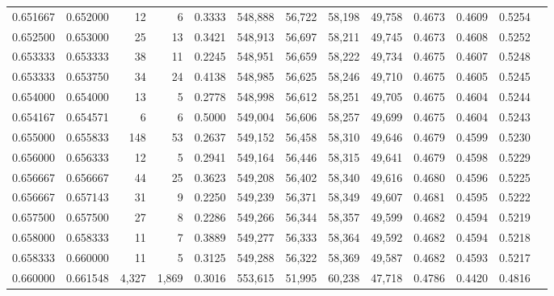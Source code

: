 \begin{tabular}{rrrrrrrrrrrrr}
0.651667 & 0.652000 &     12 &     6 &                                     0.3333 & 548,888 &  56,722 &  58,198 &  49,758 & 0.4673 & 0.4609 & 0.5254 \\
0.652500 & 0.653000 &     25 &    13 &                                     0.3421 & 548,913 &  56,697 &  58,211 &  49,745 & 0.4673 & 0.4608 & 0.5252 \\
0.653333 & 0.653333 &     38 &    11 &                                     0.2245 & 548,951 &  56,659 &  58,222 &  49,734 & 0.4675 & 0.4607 & 0.5248 \\
0.653333 & 0.653750 &     34 &    24 &                                     0.4138 & 548,985 &  56,625 &  58,246 &  49,710 & 0.4675 & 0.4605 & 0.5245 \\
0.654000 & 0.654000 &     13 &     5 &                                     0.2778 & 548,998 &  56,612 &  58,251 &  49,705 & 0.4675 & 0.4604 & 0.5244 \\
0.654167 & 0.654571 &      6 &     6 &                                     0.5000 & 549,004 &  56,606 &  58,257 &  49,699 & 0.4675 & 0.4604 & 0.5243 \\
0.655000 & 0.655833 &    148 &    53 &                                     0.2637 & 549,152 &  56,458 &  58,310 &  49,646 & 0.4679 & 0.4599 & 0.5230 \\
0.656000 & 0.656333 &     12 &     5 &                                     0.2941 & 549,164 &  56,446 &  58,315 &  49,641 & 0.4679 & 0.4598 & 0.5229 \\
0.656667 & 0.656667 &     44 &    25 &                                     0.3623 & 549,208 &  56,402 &  58,340 &  49,616 & 0.4680 & 0.4596 & 0.5225 \\
0.656667 & 0.657143 &     31 &     9 &                                     0.2250 & 549,239 &  56,371 &  58,349 &  49,607 & 0.4681 & 0.4595 & 0.5222 \\
0.657500 & 0.657500 &     27 &     8 &                                     0.2286 & 549,266 &  56,344 &  58,357 &  49,599 & 0.4682 & 0.4594 & 0.5219 \\
0.658000 & 0.658333 &     11 &     7 &                                     0.3889 & 549,277 &  56,333 &  58,364 &  49,592 & 0.4682 & 0.4594 & 0.5218 \\
0.658333 & 0.660000 &     11 &     5 &                                     0.3125 & 549,288 &  56,322 &  58,369 &  49,587 & 0.4682 & 0.4593 & 0.5217 \\
0.660000 & 0.661548 &  4,327 & 1,869 &                                     0.3016 & 553,615 &  51,995 &  60,238 &  47,718 & 0.4786 & 0.4420 & 0.4816 \\

\end{tabular}
